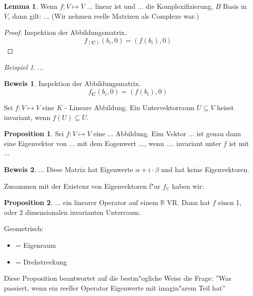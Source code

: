 \documentclass[11pt]{article}
\theoremstyle{remark}
\newtheorem{exa}{Beispiel}[section]
\theoremstyle{definition}
\newtheorem{prof}{Beweis}
\newtheorem*{proposition}{Proposition}
\newtheorem*{lemma}{Lemma}
\theoremstyle{remark}
\begin{document}
\begin{lemma}
  Wenn $f: V\mapsto V$ ... linear ist und ... die Komplexifizierung, $B$ Basis
  in $V$, dann gilt: ... (Wir nehmen reelle Matrizen als Complexe war.)
\end{lemma}

\begin{proof}
  Inspektion der Abbildungsmatrix. \[f_(\mathbf{C})(b_i,0) = (f(b_i), 0)\]
\end{proof}
\begin{exa}
  ...
\end{exa}

\begin{prof}
  Inspektion der Abbildungsmatrix. \[f_{\mathbf{C}}(b_i,0) = (f(b_i), 0)\]
\end{prof}

\begin{definition}
  Sei $f: V \mapsto V$ eine $K$ - Lineare Abbildung. Ein Untervektorraum
  $U\subseteq V$ heisst invariant, wenn $f(U) \subseteq U$.
\end{definition}

\begin{proposition}
  Sei $f: V\mapsto V$ eine ... Abbildung. Eim Vektor ... ist genau dann eine
  Eigenvektor von ... mit dem Eogenwert ..., wenn .... invariant unter $f$ ist
  mit ...
\end{proposition}

\begin{prof}
  ... Diese Matrix hat Eigenwerte $\alpha + i\cdot\beta$ und hat keine
  Eigenvektoren.
\end{prof}

Zusammen mit der Existenz von Eigenvektoren f"ur $f_{\mathbb{C}}$ haben wir:

\begin{proposition}
  ... ein linearer Operator auf einem $\mathbb{R}$ VR. Dann hat $f$ einen 1,
  oder 2 dimensionalen invarianten Unterraum.
\end{proposition}

Geometrisch:
\begin{relation}
  \begin{itemize}
  \item[1 - Dimensional] = Eigenraum
  \item[2 - Dimensional] = Drehstreckung
  \end{itemize}
\end{relation}

Diese Proposition beantwortet auf die bestm"ogliche Weise die Frage: ''Was
passiert, wenn ein reeller Operator Eigenwerte mit imagin"arem Teil hat''
\end{document}
